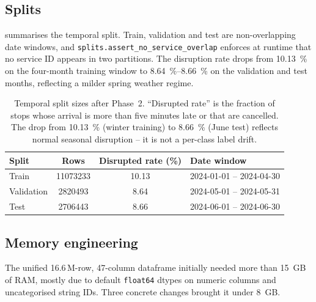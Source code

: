 \subsection{Splits}

 summarises the temporal split. Train, validation and test are non-overlapping date windows, and \texttt{splits.assert\_no\_service\_overlap} enforces at runtime that no service ID appears in two partitions. The disruption rate drops from \SI{10.13}{\percent} on the four-month training window to \SI{8.64}{\percent}--\SI{8.66}{\percent} on the validation and test months, reflecting a milder spring weather regime.

\begin{table}[H]
    \centering
    \caption{Temporal split sizes after Phase~2. ``Disrupted rate'' is the fraction of stops whose arrival is more than five minutes late or that are cancelled. The drop from \SI{10.13}{\percent} (winter training) to \SI{8.66}{\percent} (June test) reflects normal seasonal disruption -- it is not a per-class label drift.}
    \label{tab:splits}
    \small
    \begin{tabular}{l
        S[table-format=8.0,group-separator={,}]
        S[table-format=2.2]
        l}
        \toprule
        Split & {Rows} & {Disrupted rate (\%)} & Date window \\
        \midrule
        Train      & 11073233 & 10.13 & 2024-01-01 -- 2024-04-30 \\
        Validation &  2820493 &  8.64 & 2024-05-01 -- 2024-05-31 \\
        Test       &  2706443 &  8.66 & 2024-06-01 -- 2024-06-30 \\
        \bottomrule
    \end{tabular}
\end{table}

\subsection{Memory engineering}

The unified \num{16.6}\,M-row, 47-column dataframe initially needed more than \SI{15}{GB} of RAM, mostly due to default \texttt{float64} dtypes on numeric columns and uncategorised string IDs. Three concrete changes brought it under \SI{8}{GB}.

